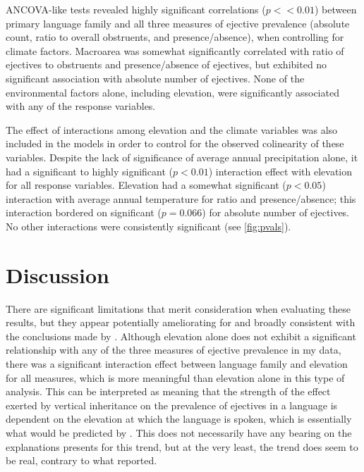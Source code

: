 \documentclass{article}
\begin{document}
ANCOVA-like tests revealed highly significant correlations ($p << 0.01$) between primary language family and all three measures of ejective prevalence (absolute count, ratio to overall obstruents, and presence/absence), when controlling for climate factors. Macroarea was somewhat significantly correlated with ratio of ejectives to obstruents and presence/absence of ejectives, but exhibited no significant association with absolute number of ejectives. None of the environmental factors alone, including elevation, were significantly associated with any of the response variables.

The effect of interactions among elevation and the climate variables was also included in the models in order to control for the observed colinearity of these variables. Despite the lack of significance of average annual precipitation alone, it had a significant to highly significant ($p < 0.01$) interaction effect with elevation for all response variables. Elevation had a somewhat significant ($p < 0.05$) interaction with average annual temperature for ratio and presence/absence; this interaction bordered on significant ($p = 0.066$) for absolute number of ejectives. No other interactions were consistently significant (see \ref{fig:pvals}). 

\section{Discussion}
There are significant limitations that merit consideration when evaluating these results, but they appear potentially ameliorating for \textcite{everett2013} and broadly consistent with the conclusions made by \textcite{urban2021}. Although elevation alone does not exhibit a significant relationship with any of the three measures of ejective prevalence in my data, there was a significant interaction effect between language family and elevation for all measures, which is more meaningful than elevation alone in this type of analysis. This can be interpreted as meaning that the strength of the effect exerted by vertical inheritance on the prevalence of ejectives in a language is dependent on the elevation at which the language is spoken, which is essentially what would be predicted by \textcite{everett2013}. This does not necessarily have any bearing on the explanations \textcite{everett2013} presents for this trend, but at the very least, the trend does seem to be real, contrary to what \textcite{hammarstroem2013} reported.
\end{document}
